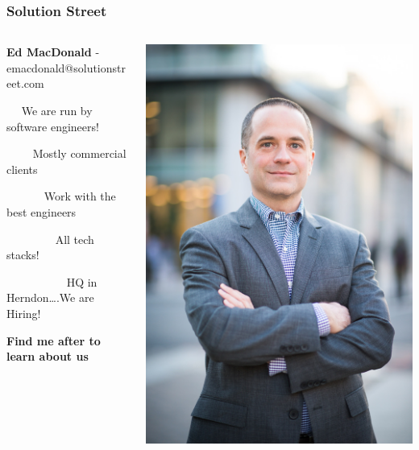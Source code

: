     \begin{frame}
        \frametitle{Solution Street}
        \begin{columns}
            \begin{column}{0.75\textwidth}
                \textbf{Ed MacDonald} - emacdonald@solutionstreet.com

                \vspace{1em}

                ~~ We are run by software engineers!

                ~~~~ Mostly commercial clients

                ~~~~~~ Work with the best engineers

                ~~~~~~~~ All tech stacks!

                ~~~~~~~~~~ HQ in Herndon….We are Hiring!

                \vspace{1em}

                \textbf{Find me after to learn about us}
            \end{column}
            \begin{column}{0.25\textwidth}
                \includegraphics[width=\textwidth,height=0.85\textheight,keepaspectratio]{graphics/Headshot}
            \end{column}
        \end{columns}
    \end{frame}

